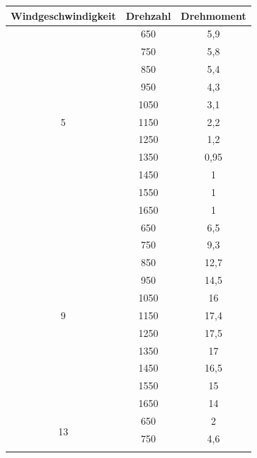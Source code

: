 \documentclass{report}
\begin{document}
\begin{table}[]
	\begin{tabular}{|c|c|c|}
		Windgeschwindigkeit  & Drehzahl & Drehmoment \\ \hline
		\multirow{11}{*}{5}  & 650      & 5,9        \\ \cline{2-4}
		                     & 750      & 5,8        \\ \cline{2-4}
		                     & 850      & 5,4        \\ \cline{2-4}
		                     & 950      & 4,3        \\ \cline{2-4}
		                     & 1050     & 3,1        \\  \cline{2-4}
		                     & 1150     & 2,2        \\ \cline{2-4}
		                     & 1250     & 1,2        \\ \cline{2-4}
		                     & 1350     & 0,95       \\ \cline{2-4}
		                     & 1450     & 1          \\ \cline{2-4}
		                     & 1550     & 1          \\ \cline{2-4}
		                     & 1650     & 1          \\ \hline
		\multirow{11}{*}{9}  & 650      & 6,5        \\ \cline{2-4}
		                     & 750      & 9,3        \\ \cline{2-4}
		                     & 850      & 12,7       \\ \cline{2-4}
		                     & 950      & 14,5       \\ \cline{2-4}
		                     & 1050     & 16         \\ \cline{2-4}
		                     & 1150     & 17,4       \\ \cline{2-4}
		                     & 1250     & 17,5       \\ \cline{2-4}
		                     & 1350     & 17         \\ \cline{2-4}
		                     & 1450     & 16,5       \\ \cline{2-4}
		                     & 1550     & 15         \\ \cline{2-4}
		                     & 1650     & 14         \\ \hline
		\multirow{11}{*}{13} & 650      & 2          \\ \cline{2-4}
		                     & 750      & 4,6        \\ \cline{2-4}

\end{tabular}
\end{table}
\end{document}
